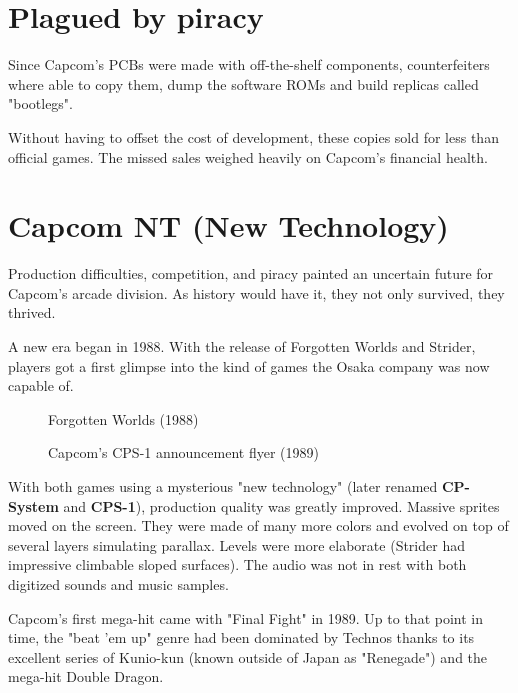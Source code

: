 \section{Plagued by piracy}
Since Capcom's PCBs were made with off-the-shelf components, counterfeiters where able to copy them, dump the software ROMs and build replicas called "bootlegs". 

Without having to offset the cost of development, these copies sold for less than official games. The missed sales weighed heavily on Capcom's financial health. 




\section{Capcom NT (New Technology)}
Production difficulties, competition, and piracy painted an uncertain future for Capcom's arcade division. As history would have it, they not only survived, they thrived.

A new era began in 1988. With the release of Forgotten Worlds and Strider, players got a first glimpse into the kind of games the Osaka company was now capable of.  



\label{nin_fw}
\begin{figure}[H]
\caption*{Forgotten Worlds (1988)}
\end{figure}



 
\label{fw_flyer}
  \begin{figure}[H]
  \caption*{Capcom's CPS-1 announcement flyer (1989)}
  \end{figure}

With both games using a mysterious "new technology" (later renamed \textbf{CP-System} and \textbf{CPS-1}), production quality was greatly improved. Massive sprites moved on the screen. They were made of many more colors and evolved on top of several layers simulating parallax. Levels were more elaborate (Strider had impressive climbable sloped surfaces). The audio was not in rest with both digitized sounds and music samples.

Capcom's first mega-hit came with "Final Fight" in 1989. Up to that point in time, the "beat 'em up" genre had been dominated by Technos thanks to its excellent series of Kunio-kun (known outside of Japan as "Renegade") and the mega-hit Double Dragon. 

